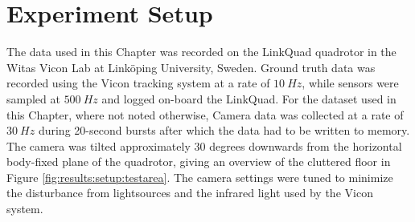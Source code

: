 \section{Experiment Setup}
    The data used in this Chapter was recorded on the LinkQuad quadrotor in the Witas Vicon Lab
    at Linköping University, Sweden. Ground truth data was recorded using
    the Vicon tracking system at a rate of $10~Hz$, while sensors were sampled
    at $500~Hz$ and logged on-board the LinkQuad.
    For the dataset used in this Chapter, where not noted otherwise,
    Camera data was collected at a rate of $30~Hz$ during 20-second bursts after
    which the data had to be written to memory.
    The camera was tilted approximately $30$ degrees downwards from the
    horizontal body-fixed plane of the quadrotor, giving an overview of the cluttered
    floor in Figure \ref{fig:results:setup:testarea}.
    The camera settings were tuned to minimize the disturbance from lightsources
    and the infrared light used by the Vicon system.

